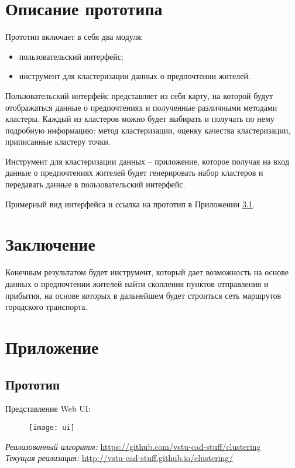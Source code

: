 \chapter{Описание прототипа}
Прототип включает в себя два модуля:
\begin{itemize}\itemsep-5pt
    \item пользовательский интерфейс;
    \item инструмент для кластеризации данных о предпочтении жителей.
\end{itemize}

Пользовательский интерфейс представляет из себя карту, на которой будут отображаться данные о
предпочтениях и полученные различными методами кластеры. Каждый из кластеров можно будет
выбирать и получать по нему подробную информацию: метод кластеризации, оценку качества
кластеризации, приписанные кластеру точки.

Инструмент для кластеризации данных -- приложение, которое получая на вход данные о предпочтениях
жителей будет генерировать набор кластеров и передавать данные в пользовательский интерфейс.

Примерный вид интерфейса и ссылка на прототип в Приложении \ref{ref:ui}.

\chapter{Заключение}
Конечным результатом будет инструмент, который дает возможность на основе данных о предпочтении
жителей найти скопления пунктов отправления и прибытия, на основе которых в дальнейшем будет
строиться сеть маршрутов городского транспорта.

\chapter{Приложение}
\section{Прототип}\label{ref:ui}
Представление Web UI:
\begin{figure}[ht!]
    \texttt{[image: ui]}
\end{figure}

\noindent
\emph{Реализованный алгоритм:} \url{https://github.com/vstu-cad-stuff/clustering}\\
\emph{Текущая реализация:} \url{http://vstu-cad-stuff.github.io/clustering/}\\

